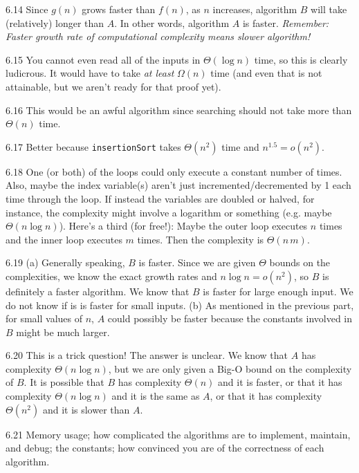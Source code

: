 \begin{RequAnswer}{6.14}
Since $g(n)$ grows faster than $f(n)$, as $n$ increases, algorithm $B$ will take (relatively) longer than $A$.
In other words, algorithm $A$ is faster.
{\em Remember: Faster growth rate of computational complexity means slower algorithm!}
\end{RequAnswer}
\begin{RequAnswer}{6.15}
You cannot even read all of the inputs in $\Theta(\log n)$ time, so this is clearly ludicrous.
It would have to take {\em at least} $\Omega(n)$ time
(and even that is not attainable, but we aren't ready for that proof yet).
\end{RequAnswer}
\begin{RequAnswer}{6.16}
This would be an awful algorithm since searching should not take more than $\Theta(n)$ time.
\end{RequAnswer}
\begin{RequAnswer}{6.17}
Better because \verb+insertionSort+ takes $\Theta(n^2)$ time and $n^{1.5}=o(n^2)$.
\end{RequAnswer}
\begin{RequAnswer}{6.18}
One (or both) of the loops could only execute a constant number of times.
Also, maybe the index variable(s) aren't just incremented/decremented by 1 each time through the loop.
If instead the variables are doubled or halved, for instance, the complexity might involve a logarithm or something
(e.g. maybe $\Theta(n\log n)$).
Here's a third (for free!): Maybe the outer loop executes $n$ times and the inner loop executes $m$ times.
Then the complexity is $\Theta(n\, m)$.
\end{RequAnswer}
\begin{RequAnswer}{6.19}
(a) Generally speaking, $B$ is faster. Since we are given $\Theta$ bounds on the complexities, we know
the exact growth rates and $n\log n = o(n^2)$, so $B$ is definitely a faster algorithm.
We know that $B$ is faster for large enough input. We do not know if is is faster for small inputs.
(b) As mentioned in the previous part, for small values of $n$, $A$ could possibly be faster because the
constants involved in $B$ might be much larger.
\end{RequAnswer}
\begin{RequAnswer}{6.20}
This is a trick question! The answer is unclear. We know that $A$ has complexity $\Theta(n\log n)$, but
we are only given a Big-O bound on the complexity of $B$. It is possible that $B$ has complexity
$\Theta(n)$ and it is faster, or that it has complexity $\Theta(n\log n)$ and it is the same as $A$,
or that it has complexity $\Theta(n^2)$ and it is slower than $A$.
\end{RequAnswer}
\begin{RequAnswer}{6.21}
Memory usage;
how complicated the algorithms are to implement, maintain, and debug;
the constants; how convinced you are of the correctness of each algorithm.
\end{RequAnswer}

